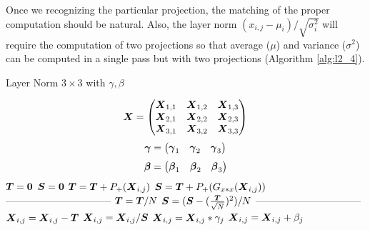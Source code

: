 \documentclass[acmsmall]{acmart}
\begin{document}
Once we recognizing the particular projection, the matching of the
proper computation should be natural. Also, the layer norm $(x_{i,j} -
\mu_i)/\sqrt{\sigma^2_i}$ will require the computation of two
projections so that average ($\mu$) and variance ($\sigma^2$) can be
computed in a single pass but with two projections (Algorithm
\ref{alg:l2_4}).

\begin{algorithm}
    \caption{Layer Norm $3\times 3$ with $\gamma, \beta$}
    \label{alg:l2_4}
    \begin{algorithmic}
      \STATE \[
        {\boldsymbol X}  =   \begin{pmatrix}
          {\boldsymbol X}_{1,1} &    {\boldsymbol X}_{1,2}&    {\boldsymbol X}_{1,3}  \\
          {\boldsymbol X}_{2,1} &    {\boldsymbol X}_{2,2}&    {\boldsymbol X}_{2,3}  \\
          {\boldsymbol X}_{3,1} &    {\boldsymbol X}_{3,2}&    {\boldsymbol X}_{3,3}  \\
        \end{pmatrix}
      \] 
      \STATE \[
        {\boldsymbol \gamma}  =   \begin{pmatrix}
          {\boldsymbol \gamma}_{1} &    {\boldsymbol \gamma}_{2}&    {\boldsymbol \gamma}_{3}  \\
        \end{pmatrix}
      \] 
      \STATE \[
        {\boldsymbol \beta}  =   \begin{pmatrix}
          {\boldsymbol \beta}_{1} &    {\boldsymbol \beta}_{2}&    {\boldsymbol \beta}_{3}  \\
        \end{pmatrix}
      \] 
          \STATE ${\boldsymbol T} = {\boldsymbol 0} $  
          \STATE ${\boldsymbol S} = {\boldsymbol 0} $ 
              \STATE ${\boldsymbol T} = {\boldsymbol T} +P_+({\boldsymbol X}_{i,j})$               
              \STATE ${\boldsymbol S} = {\boldsymbol T} +P_+(G_{x*x}({\boldsymbol X}_{i,j}))$   
          \ENDWHILE
          \STATE --------------------------------     
          \STATE ${\boldsymbol T}  =   {\boldsymbol T}/N$       
          \STATE ${\boldsymbol S}  =   ({\boldsymbol S} - (\frac{{\boldsymbol T}}{\sqrt{N}})^2)/N$       
          \STATE --------------------------------     
             \STATE $ {\boldsymbol X}_{i,j} = {\boldsymbol X}_{i,j}-{\boldsymbol T}$  
             \STATE $ {\boldsymbol X}_{i,j} = {\boldsymbol X}_{i,j}/{\boldsymbol S}$   
             \STATE $ {\boldsymbol X}_{i,j} = {\boldsymbol X}_{i,j}*\gamma_j$   
             \STATE $ {\boldsymbol X}_{i,j} = {\boldsymbol X}_{i,j} + \beta_j$   
          \ENDWHILE
      \ENDWHILE
    \end{algorithmic}
\end{algorithm}
\end{document}
